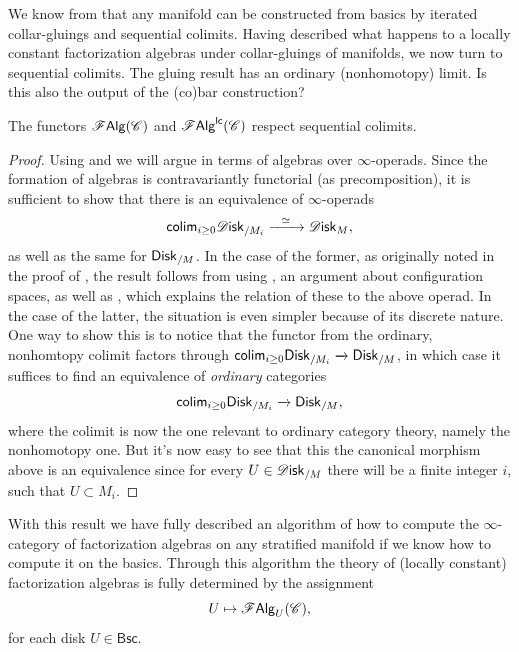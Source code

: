 \documentclass[../text]{subfiles}
\begin{document}
We know from  that any manifold can be constructed from basics by iterated collar-gluings and sequential colimits. Having described what happens to a locally constant factorization algebras under collar-gluings of manifolds, we now turn to sequential colimits. {\color{red} The gluing result has an ordinary (nonhomotopy) limit. Is this also the output of the (co)bar construction?}

\begin{proposition}\label{prop:fa_seq_col}
    The functors $\mathscr{F} \mathsf{Alg}(\mathscr{C})$ and $\mathscr{F} \mathsf{Alg}^{\mathsf{lc}}(\mathscr{C})$ respect sequential colimits.
\end{proposition}

\begin{proof}
    Using  and  we will argue in terms of algebras over $\infty$-operads. Since the formation of algebras is contravariantly functorial (as precomposition), it is sufficient to show that there is an equivalence of $\infty$-operads
    \begin{equation}
        \mathsf{colim}_{i \geq 0} \disk_{/M_i} \xrightarrow{\ \ \simeq \ \ } \disk_{M},
    \end{equation}
    as well as the same for $\disk[r]_{/M}$. In the case of the former, as originally noted in the proof of \cite[cor.2.40]{aft_fhstrat}, the result follows from using \cite[cor.1.6.]{dugger2004hypercovers}, an argument about configuration spaces, as well as \cite[lem.2.21]{aft_fhstrat}, which explains the relation of these to the above operad. In the case of the latter, the situation is even simpler because of its discrete nature. One way to show this is to notice that the functor from the ordinary, nonhomtopy colimit factors through $\mathsf{colim}_{i \geq 0} \disk[r]_{/M_i} \xrightarrow{} \disk[r]_{/M}$, in which case it suffices to find an equivalence of \emph{ordinary} categories
    \begin{equation}
        \mathsf{colim}_{i \geq 0} \disk[r]_{/M_i} \xrightarrow{} \disk[r]_{/M},
    \end{equation}
    where the colimit is now the one relevant to ordinary category theory, namely the nonhomotopy one. But it's now easy to see that this the canonical morphism above is an equivalence since for every $U \in \disk_{/M}$ there will be a finite integer $i$, such that $U \subset M_i$.
\end{proof}

With this result we have fully described an algorithm of how to compute the $\infty$-category of factorization algebras on any stratified manifold if we know how to compute it on the basics. Through this algorithm the theory of (locally constant) factorization algebras is fully determined by the assignment
%
\begin{equation}
    U \mapsto \mathscr{F} \mathsf{Alg}_U (\mathscr{C}),
\end{equation}
%
for each disk $U \in \mathsf{Bsc}$.
\end{document}
